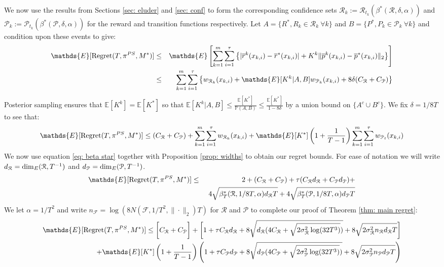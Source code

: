 \documentclass{article}
\newcommand{\Exp}{\mathds{E}}
\newcommand{\Prob}{\mathds{P}}
\newcommand{\Pc}{\mathcal{P}}
\newcommand{\Fc}{\mathcal{F}}
\newcommand{\Rc}{\mathcal{R}}
\begin{document}
We now use the results from Sections \ref{sec: eluder} and \ref{sec: conf} to form the corresponding confidence sets $\Rc_k := \Rc_{t_k}(\beta^*(\Rc,\delta,\alpha))$ and $\Pc_k := \Pc_{t_k}(\beta^*(\Pc,\delta,\alpha))$ for the reward and transition functions respectively.
Let $A = \{R^*, R_k \in \Rc_k \ \forall k \}$ and $B = \{P^*,P_k \in \Pc_k \ \forall k \}$ and condition upon these events to give:
\begin{eqnarray}
\label{eq: reg widths}
	\Exp[{\rm Regret}(T,\pi^{PS},M^*)] &\le&
	\Exp\left[ \sum_{k=1}^m \sum_{i=1}^\tau
		\left\{ | \overline{r}^k(x_{k,i}) - \overline{r}^*(x_{k,i})|
		+ K^k \|\overline{p}^k(x_{k,i}) - \overline{p}^*(x_{k,i}) \|_2 \right\}\right] \nonumber \\
	&\le& \sum_{k=1}^m \sum_{i=1}^\tau \left\{ w_{\Rc_k}(x_{k,i}) +
		 \Exp[K^k|A,B] w_{\Pc_k}(x_{k,i}) + 8 \delta (C_\Rc + C_\Pc) \right\}
\end{eqnarray}
Posterior sampling ensures that $\Exp[K^k] = \Exp[K^*]$ so that
$\Exp[K^k|A,B] \le \frac{\Exp[K^*]}{\Prob(A,B)} \le \frac{\Exp[K^*]}{1-8\delta}$
by a union bound on $\{A^c \cup B^c\}$.
We fix $\delta = 1/8T$ to see that:
$$ \Exp[{\rm Regret}(T,\pi^{PS},M^*)] \le (C_\Rc + C_\Pc) +
	\sum_{k=1}^m \sum_{i=1}^\tau w_{\Rc_k}(x_{k,i})
	+ \Exp[K^*] \left(1+\frac{1}{T-1} \right)\sum_{k=1}^m \sum_{i=1}^\tau w_{\Pc_t}(x_{k,i})  $$
We now use equation \eqref{eq: beta star} together with Proposition \ref{prop: widths} to obtain our regret bounds.
For ease of notation we will write $d_\Rc = {\rm dim}_E(\Rc,T^{-1})$ and $d_\Pc = {\rm dim}_E(\Pc,T^{-1})$.
\begin{eqnarray}
	\Exp[{\rm Regret}(T,\pi^{PS},M^*)] &\le&
	2 + (C_\Rc + C_\Pc) + \tau(C_\Rc d_\Rc+ C_\Pc d_\Pc) + \nonumber \\
	&& \  4 \sqrt{\beta_T^*(\Rc,1/8T,\alpha) d_\Rc T} + 4 \sqrt{\beta_T^*(\Pc,1/8T,\alpha) d_\Pc T}
\end{eqnarray}
We let $\alpha = 1/T^2$ and write $n_\Fc = \log(8 N(\Fc,1/T^2,\|\cdot\|_2)T)$ for $\Rc$ and $\Pc$ to complete our proof of Theorem \ref{thm: main regret}:
\begin{eqnarray}
	\Exp[{\rm Regret}(T,\pi^{PS},M^*)] \le
	\bigg[ C_\Rc + C_\Pc \bigg] +
	\bigg[ 1 + \tau C_\Rc d_\Rc + 8\sqrt{d_\Rc(4C_\Rc + \sqrt{2\sigma_\Rc^2 \log(32T^3)})}
	+ 8\sqrt{2 \sigma_\Rc^2 n_\Rc d_\Rc T} \bigg] \nonumber \\
	+ \Exp[K^*]\left(1+\frac{1}{T-1}\right)\left( 1 + \tau C_\Pc d_\Pc + 8\sqrt{d_\Pc(4C_\Pc + \sqrt{2\sigma_\Pc^2 \log(32T^3)})}
	+ 8\sqrt{2 \sigma_\Pc^2 n_\Pc d_\Pc T} \right) \nonumber
\end{eqnarray}
\end{document}
